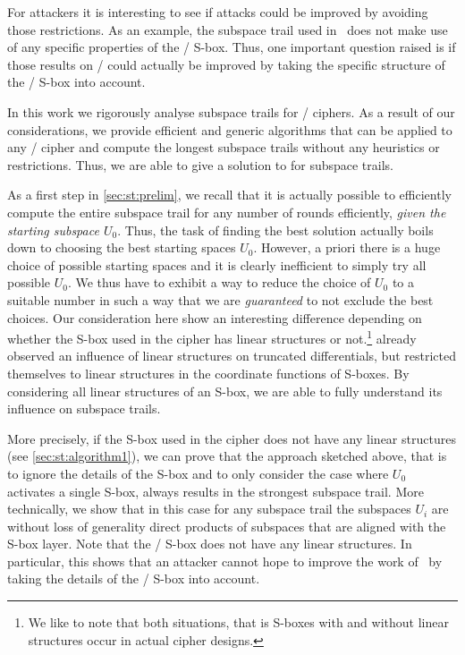 For attackers it is interesting to see if attacks could be improved by avoiding those restrictions.
As an example, the subspace trail used in~\cite{EC:GraRecRon17} does not make use of any specific properties of the \AES/ S-box.
Thus, one important question raised is if those results on \AES/ could actually be improved by taking the specific structure of the \AES/ S-box into account.

In this work we rigorously analyse subspace trails for \SPN/ ciphers.
As a result of our considerations, we provide efficient and generic algorithms that can be applied to any \SPN/ cipher and compute the longest subspace trails without any heuristics or restrictions.
Thus, we are able to give a solution to  for subspace trails.

As a first step in \cref{sec:st:prelim}, we recall that it is actually possible to efficiently compute the entire subspace trail for any number of rounds efficiently, \emph{given the starting subspace $U_0$}.
Thus, the task of finding the best solution actually boils down to choosing the best starting spaces $U_0$.
However, a priori there is a huge choice of possible starting spaces and it is clearly inefficient to simply try all possible $U_0$.
We thus have to exhibit a way to reduce the choice of $U_0$ to a suitable number in such a way that we are \emph{guaranteed} to not exclude the best choices.
Our consideration here show an interesting difference depending on whether the S-box used in the cipher has linear structures or not.\footnote{%
    We like to note that both situations, that is S-boxes with and without linear structures occur in actual cipher designs.
}
\textcite{LIGHTSEC:MakTez14} already observed an influence of linear structures on truncated differentials, but restricted themselves to linear structures in the coordinate functions of S-boxes.
By considering all linear structures of an S-box, we are able to fully understand its influence on subspace trails.

More precisely, if the S-box used in the cipher does not have any linear structures (see \cref{sec:st:algorithm1}), we can prove that the approach sketched above, that is to ignore the details of the S-box and to only consider the case where $U_0$ activates a single S-box, always results in the strongest subspace trail.
More technically, we show that in this case for any subspace trail the subspaces $U_i$ are without loss of generality direct products of subspaces that are aligned with the S-box layer.
Note that the \AES/ S-box does not have any linear structures.
In particular, this shows that an attacker cannot hope to improve the work of~\cite{EC:GraRecRon17} by taking the details of the \AES/ S-box into account.

